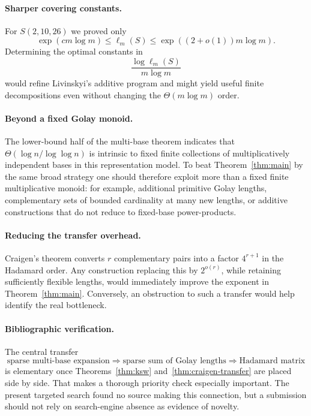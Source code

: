 \documentclass[11pt]{article}
\begin{document}
\paragraph{Sharper covering constants.}
For $S(2,10,26)$ we proved only
\[
\exp(c m\log m)\le\ell_m(S)\le\exp((2+o(1))m\log m).
\]
Determining the optimal constants in
\[
\frac{\log\ell_m(S)}{m\log m}
\]
would refine Livinskyi's additive program and might yield useful finite decompositions even without changing the $\Theta(m\log m)$ order.

\paragraph{Beyond a fixed Golay monoid.}
The lower-bound half of the multi-base theorem indicates that $\Theta(\log n/\log\log n)$ is intrinsic to fixed finite collections of multiplicatively independent bases in this representation model.  To beat Theorem~\ref{thm:main} by the same broad strategy one should therefore exploit more than a fixed finite multiplicative monoid: for example, additional primitive Golay lengths, complementary sets of bounded cardinality at many new lengths, or additive constructions that do not reduce to fixed-base power-products.

\paragraph{Reducing the transfer overhead.}
Craigen's theorem converts $r$ complementary pairs into a factor $4^{r+1}$ in the Hadamard order.  Any construction replacing this by $2^{o(r)}$, while retaining sufficiently flexible lengths, would immediately improve the exponent in Theorem~\ref{thm:main}.  Conversely, an obstruction to such a transfer would help identify the real bottleneck.

\paragraph{Bibliographic verification.}
The central transfer
\[
\text{sparse multi-base expansion}
\Longrightarrow
\text{sparse sum of Golay lengths}
\Longrightarrow
\text{Hadamard matrix}
\]
is elementary once Theorems~\ref{thm:ksw} and~\ref{thm:craigen-transfer} are placed side by side.  That makes a thorough priority check especially important.  The present targeted search found no source making this connection, but a submission should not rely on search-engine absence as evidence of novelty.
\end{document}
